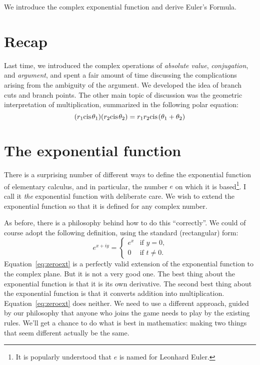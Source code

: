 \documentclass[twocolumn,12pt]{article}
\date{February 15, 2013 (Fri)}
\begin{document}
\makeheader

\begin{summary}
We introduce the complex exponential function and derive Euler's Formula.
\end{summary}

\section{Recap}
Last time, we introduced the complex operations of \emph{absolute value}, \emph{conjugation}, and \emph{argument}, and spent a fair amount of time discussing the complications arising from the ambiguity of the argument. We developed the idea of branch cuts and branch points. The other main topic of discussion was the geometric interpretation of multiplication, summarized in the following polar equation:
\[
  (r_1 \cis{\theta_1})(r_2 \cis{\theta_2}) = r_1 r_2 \cis{(\theta_1 + \theta_2)}
\]

\section{The exponential function}
There is a surprising number of different ways to define the exponential function of elementary calculus, and in particular, the number $e$ on which it is based\footnote{It is popularly understood that $e$ is named for Leonhard Euler.}. I call it \emph{the} exponential function with deliberate care. We wish to extend the exponential function so that it is defined for any complex number. 

As before, there is a philosophy behind how to do this ``correctly''. We could of course adopt the following definition, using the standard (rectangular) form:
\begin{equation}
    \tag{Stupid}
    e^{x+iy} = \begin{cases}
        e^x & \text{if $y = 0$,} \\
        0   & \text{if $t \ne 0$}.
    \end{cases}
    \label{eq:zeroext}
\end{equation}
Equation~\eqref{eq:zeroext} is a perfectly valid extension of the exponential function to the complex plane. But it is not a very good one. The best thing about the exponential function is that it is its own derivative. The second best thing about the exponential function is that it converts addition into multiplication. Equation~\eqref{eq:zeroext} does neither. We need to use a different approach, guided by our philosophy that anyone who joins the game needs to play by the existing rules. We'll get a chance to do what is best in mathematics: making two things that seem different actually be the same. 
\end{document}
